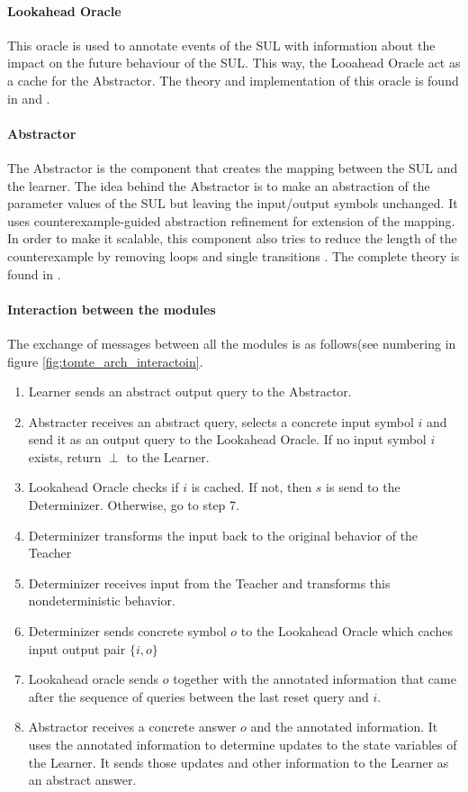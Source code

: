 \documentclass[multi,crop=false,class=article]{standalone}
\begin{document}
\paragraph{Lookahead Oracle}
This oracle is used to annotate events of the SUL with information about the 
impact on the future behaviour of the SUL. This way, the Looahead Oracle act as 
a cache for the Abstractor. The theory and implementation of 
this oracle is found in \cite{Aarts2014} and \cite{tomte14}.

\paragraph{Abstractor}
The Abstractor is the component that creates the mapping between the SUL and 
the learner. The idea behind the Abstractor is to make an abstraction of the 
parameter values of the SUL but leaving the input/output symbols unchanged. It 
uses counterexample-guided abstraction refinement\cite{tomte14} for extension 
of the mapping. In order to make it scalable, this component also tries to 
reduce the length of the counterexample by removing loops and single 
transitions \cite{Koopman2014}. The complete theory is found in \cite{tomte14}.

\paragraph{Interaction between the modules} The exchange of messages between 
all the modules is as follows(see numbering in figure 
\ref{fig:tomte_arch_interactoin}.
\begin{enumerate}
	\item Learner sends an abstract output query to the Abstractor.
	\item Abstracter receives an abstract query, selects a concrete input 
	symbol $i$ and send it as an output query to the Lookahead Oracle. If no 
	input symbol $i$ exists, return $\perp$ to the Learner.
	\item  Lookahead Oracle checks if $i$ is cached. If not, then $s$ is send 
	to the Determinizer. Otherwise, go to step 7.
	\item Determinizer transforms the input back to the original behavior of 
	the Teacher  
	\item Determinizer receives input from the Teacher and transforms this 
	nondeterministic behavior.
	\item Determinizer sends concrete symbol $o$ to the Lookahead Oracle which 
	caches input output pair $\{i,o\}$
	\item Lookahead oracle sends $o$ together with the annotated information 
	that came after the sequence of queries between the last reset query and 
	$i$.
	\item Abstractor receives a concrete answer $o$ and the annotated 
	information. It uses the annotated information to determine updates to the 
	state variables of the Learner. It sends those updates and other 
	information to the Learner as an abstract answer. 
\end{enumerate}


\end{document}

